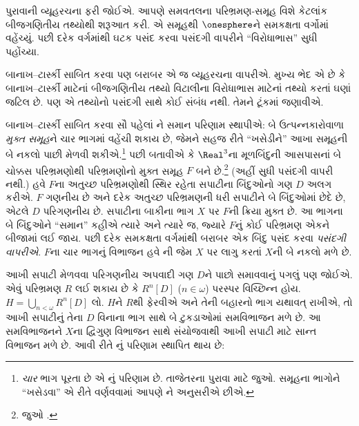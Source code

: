 \documentclass[../../../include/open-logic-section]{subfiles}
\begin{document}
પુરાવાની વ્યૂહરચના ફરી જોઈએ.
આપણે સમવતલના પરિભ્રમણ-સમૂહ
વિશે કેટલાંક બીજગણિતીય તથ્યોથી
શરૂઆત કરી. એ સમૂહથી
$\onesphere$ને સમકક્ષતા વર્ગોમાં
વહેંચ્યું. પછી દરેક વર્ગમાંથી
ઘટક પસંદ કરવા પસંદગી વાપરીને
``વિરોધાભાસ'' સુધી પહોંચ્યા.

બાનાખ--ટાર્સ્કી સાબિત કરવા પણ
બરાબર એ જ વ્યૂહરચના વાપરીએ.
મુખ્ય ભેદ એ છે કે બાનાખ--ટાર્સ્કી
માટેનાં બીજગણિતીય તથ્યો
વિટાલીના વિરોધાભાસ માટેનાં
તથ્યો કરતાં ઘણાં જટિલ છે.
પણ એ તથ્યોનો પસંદગી સાથે
કોઈ સંબંધ નથી. તેમને ટૂંકમાં
જણાવીએ.

બાનાખ--ટાર્સ્કી સાબિત કરવા
સૌ પહેલાં ને
સમાન પરિણામ સ્થાપીએ: બે ઉત્પન્નકારોવાળા
\emph{મુક્ત સમૂહ}ને ચાર ભાગમાં
વહેંચી શકાય છે, જેમને સહજ રીતે
``ખસેડીને'' આખા સમૂહની બે
નકલો પાછી મેળવી શકીએ.\footnote{
\emph{ચાર} ભાગ પૂરતા છે એ
\cite{Robinson1947}નું પરિણામ છે.
તાજેતરના પુરાવા માટે
\citet[Theorem 5.2]{Wagon2016} જુઓ.
સમૂહના ભાગોને ``ખસેડવા''
એ રીતે વર્ણવવામાં આપણે
\citet[p.~3]{Weston2003}ને
અનુસરીએ છીએ.}
પછી બતાવીએ કે $\Real^3$ના
મૂળબિંદુની આસપાસનાં બે ચોક્કસ
પરિભ્રમણોથી પરિભ્રમણોનો
મુક્ત સમૂહ $F$ બને છે.\footnote{જુઓ
\citet[Theorem 2.1]{Wagon2016}.}
(અહીં સુધી પસંદગી વાપરી નથી.)
હવે $F$ના અતુચ્છ પરિભ્રમણોથી સ્થિર રહેતા સપાટીના બિંદુઓનો
ગણ $D$ અલગ કરીએ. $F$ ગણનીય છે અને દરેક અતુચ્છ પરિભ્રમણની ધરી
સપાટીને બે બિંદુઓમાં છેદે છે, એટલે $D$ પરિગણનીય છે. સપાટીના
બાકીના ભાગ $X$ પર $F$ની ક્રિયા મુક્ત છે. આ ભાગના બે બિંદુઓને
``સમાન'' કહીએ ત્યારે અને ત્યારે જ, જ્યારે $F$નું કોઈ પરિભ્રમણ
એકને બીજામાં લઈ જાય. પછી દરેક સમકક્ષતા વર્ગમાંથી બરાબર એક
બિંદુ પસંદ કરવા \emph{પસંદગી વાપરીએ}. $F$ના ચાર ભાગનું વિભાજન
હવે ની જેમ $X$ પર લાગુ કરતાં $X$ની
બે નકલો મળે છે.

આખી સપાટી મેળવવા પરિગણનીય અપવાદી ગણ $D$ને પાછો સમાવવાનું
પગલું પણ જોઈએ. એવું પરિભ્રમણ $R$ લઈ શકાય છે કે $R^n[D]$
($n\in\omega$) પરસ્પર વિચ્છિન્ન હોય. $H=\bigcup_{n<\omega}R^n[D]$
લો. $H$ને $R$થી ફેરવીએ અને તેની બહારનો ભાગ યથાવત્ રાખીએ,
તો આખી સપાટીનું તેના $D$ વિનાના ભાગ સાથે બે ટુકડાઓમાં
સમવિભાજન મળે છે. આ સમવિભાજનને $X$ના દ્વિગુણ વિભાજન સાથે
સંયોજવાથી આખી સપાટી માટે સાન્ત વિભાજન મળે છે. આવી રીતે
\citep{Hausdorff1914}નું પરિણામ સ્થાપિત થાય છે:
\end{document}
